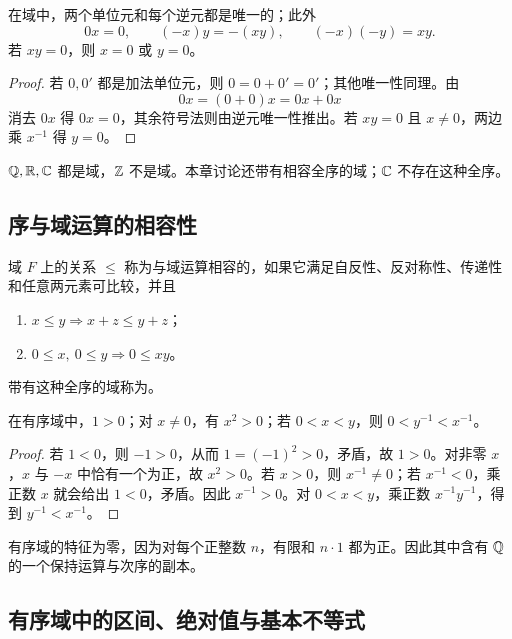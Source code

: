\begin{proposition}
在域中，两个单位元和每个逆元都是唯一的；此外
\[
 0x=0,\qquad (-x)y=-(xy),\qquad (-x)(-y)=xy.
\]
若 \(xy=0\)，则 \(x=0\) 或 \(y=0\)。
\end{proposition}

\begin{proof}
若 \(0,0'\) 都是加法单位元，则 \(0=0+0'=0'\)；其他唯一性同理。由
\[
 0x=(0+0)x=0x+0x
\]
消去 \(0x\) 得 \(0x=0\)，其余符号法则由逆元唯一性推出。若 \(xy=0\) 且 \(x\ne0\)，两边乘 \(x^{-1}\) 得 \(y=0\)。
\end{proof}

\(\mathbb{Q},\mathbb{R},\mathbb{C}\) 都是域，\(\mathbb{Z}\) 不是域。本章讨论还带有相容全序的域；\(\mathbb{C}\) 不存在这种全序。

\subsection{序与域运算的相容性}


\begin{definition}
域 \(F\) 上的关系 \(\le\) 称为与域运算相容的，如果它满足自反性、反对称性、传递性和任意两元素可比较，并且
\begin{enumerate}
 \item \(x\le y\Rightarrow x+z\le y+z\)；
 \item \(0\le x,\ 0\le y\Rightarrow0\le xy\)。
\end{enumerate}
带有这种全序的域称为。
\end{definition}

\begin{proposition}
在有序域中，\(1>0\)；对 \(x\ne0\)，有 \(x^2>0\)；若 \(0<x<y\)，则 \(0<y^{-1}<x^{-1}\)。
\end{proposition}

\begin{proof}
若 \(1<0\)，则 \(-1>0\)，从而 \(1=(-1)^2>0\)，矛盾，故 \(1>0\)。对非零 \(x\)，\(x\) 与 \(-x\) 中恰有一个为正，故 \(x^2>0\)。若 \(x>0\)，则 \(x^{-1}\ne0\)；若 \(x^{-1}<0\)，乘正数 \(x\) 就会给出 \(1<0\)，矛盾。因此 \(x^{-1}>0\)。对 \(0<x<y\)，乘正数 \(x^{-1}y^{-1}\)，得到 \(y^{-1}<x^{-1}\)。
\end{proof}

有序域的特征为零，因为对每个正整数 \(n\)，有限和 \(n\cdot1\) 都为正。因此其中含有 \(\mathbb{Q}\) 的一个保持运算与次序的副本。

\subsection{有序域中的区间、绝对值与基本不等式}


